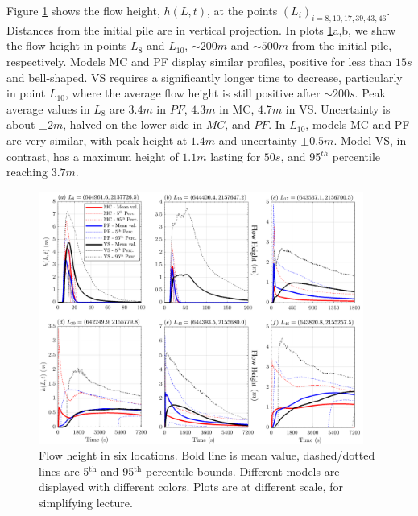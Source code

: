 \documentclass{article}
\begin{document}
Figure \ref{fig:Colima-H} shows the flow height, $h(L,t)$, at the points $(L_i)_{i=8,10,17,39,43,46}$. Distances from the initial pile are in vertical projection. In plots \ref{fig:Colima-H}a,b, we show the flow height in points $L_8$ and $L_{10}$, $\sim 200 m$ and $\sim 500 m$ from the initial pile, respectively. Models MC and PF display similar profiles, positive for less than $15 s$ and bell-shaped. VS requires a significantly longer time to decrease, particularly in point $L_{10}$, where the average flow height is still positive after $\sim 200 s$. Peak average values in $L_8$ are $3.4 m$ in $PF$, $4.3 m$ in MC, $4.7 m$ in VS. Uncertainty is about $\pm 2 m$, halved on the lower side in $MC$, and $PF$. In $L_{10}$, models MC and PF are very similar, with peak height at $1.4 m$ and uncertainty $\pm 0.5 m$. Model VS, in contrast, has a maximum height of $1.1 m$ lasting for $50s$, and 95$^{th}$ percentile reaching $3.7 m$.
\begin{figure}[H]
         \centering
        \includegraphics[width=0.95\textwidth]{figures/Colima/Height.png}
        \caption{Flow height in six locations. Bold line is mean value, dashed/dotted lines are 5$^{\mathrm{th}}$ and 95$^{\mathrm{th}}$ percentile bounds. Different models are displayed with different colors. Plots are at different scale, for simplifying lecture.}
        \label{fig:Colima-H}
\end{figure}
\end{document}
